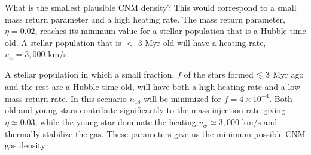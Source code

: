 \documentclass[usenatbib,fleqn]{mnras}
\newcommand\lsim{\mathrel{\rlap{\lower4pt\hbox{\hskip1pt$\sim$}}
    \raise1pt\hbox{$<$}}}
\begin{document}



What is the smallest plausible CNM density? This would correspond to a
small mass return parameter and a high heating rate. The mass return
parameter, $\eta=0.02$, reaches its minimum value for a stellar
population that is a Hubble time old. A stellar population
that is $<$ 3 Myr old will have a heating rate, $v_w=3,000$ km/s.

A stellar population in which a small fraction, $f$ of the stars
formed $\lsim 3$ Myr ago and the rest are a Hubble time old, will have
both a high heating rate and a low mass return rate. In this scenario
$n_{18}$ will be minimized for $f=4\times 10^{-4}$. Both old and young
stars contribute significantly to the mass injection rate giving
$\eta\simeq 0.03$, while the young star dominate the heating
$v_w\simeq 3,000$ km/s and thermally stabilize the gas. These
parameters give us the minimum possible CNM gas density
\end{document}

